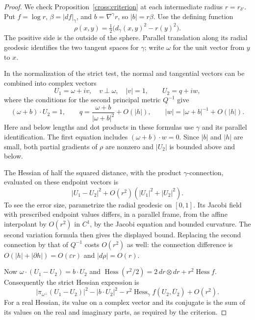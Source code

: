 \begin{proof}
We check Proposition~\ref{cross:criterion} at each intermediate radius
$r=r_{\delta'}$.  Put $f=\log r$, $\beta=|df|_\gamma$, and
$b=\nabla^\gamma r$, so $|b|=r\beta$.  Use the defining function
\[
 \rho(x,y)=\tfrac12\bigl(d_\gamma(x,y)^2-r(y)^2\bigr).
\]
The positive side is the outside of the sphere.  Parallel translation
along its radial geodesic identifies the two tangent spaces for
$\gamma$; write $\omega$ for the unit vector from $y$ to $x$.

In the normalization of the strict test, the normal and tangential
vectors can be combined into complex vectors
\[
 U_1=\omega+i v,\quad v\perp\omega,\quad |v|=1,
 \qquad U_2=q+i w,
\]
where the conditions for the second principal metric $Q^{-1}$ give
\begin{equation}\label{balls:test-vectors}
 (\omega+b)\cdot U_2=1,\qquad
 q=\frac{\omega+b}{|\omega+b|^2}+O(|h|),\qquad
 |w|=|\omega+b|^{-1}+O(|h|).
\end{equation}
Here and below lengths and dot products in these formulas use $\gamma$
and its parallel identification.  The first equation includes
$(\omega+b)\cdot w=0$.  Since $|b|$ and $|h|$ are small, both partial
gradients of $\rho$ are nonzero and $|U_2|$ is bounded above and below.

The Hessian of half the squared distance, with the product
$\gamma$-connection, evaluated on these endpoint vectors is
\[
 |U_1-U_2|^2+O(r^2)(|U_1|^2+|U_2|^2).
\]
To see the error size, parametrize the radial geodesic on $[0,1]$.
Its Jacobi field with prescribed endpoint values differs, in a parallel
frame, from the affine interpolant by $O(r^2)$ in $C^1$, by the Jacobi
equation and bounded curvature.  The second variation formula then gives
the displayed bound.  Replacing the second connection by that of
$Q^{-1}$ costs $O(r^2)$ as well: the connection difference is
$O(|h|+|\partial h|)=O(\varepsilon r)$ and $|d\rho|=O(r)$.

Now
$\omega\cdot(U_1-U_2)=b\cdot U_2$ and
$\operatorname{Hess}(r^2/2)=2\,dr\otimes dr+r^2\operatorname{Hess}f$.
Consequently the strict Hessian expression is
\begin{equation}\label{balls:test-expression}
 |\pi_{\omega^\perp}(U_1-U_2)|^2-|b\cdot U_2|^2
      -r^2\operatorname{Hess}_\gamma f(U_2,\overline U_2)+O(r^2).
\end{equation}
For a real Hessian, its value on a complex vector and its conjugate is
the sum of its values on the real and imaginary parts, as required by
the criterion.


\end{proof}
